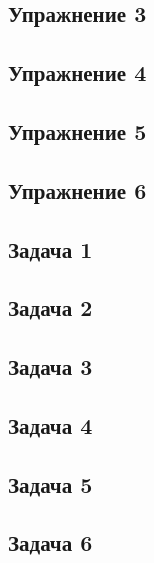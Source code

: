 \documentclass[a4paper]{article}
\begin{document}
\subsection*{Упражнение 3}
\subsection*{Упражнение 4}
\subsection*{Упражнение 5}
\subsection*{Упражнение 6}
\subsection*{Задача 1}
\subsection*{Задача 2}
\subsection*{Задача 3}
\subsection*{Задача 4}
\subsection*{Задача 5}
\subsection*{Задача 6}
\end{document}
